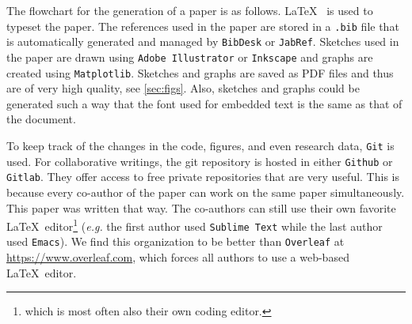 \documentclass[authoryear,3p,times,preprint,review,fleqn]{elsarticle}
\newcommand{\eg}{\textit{e.g.}\xspace}
\numberwithin{equation}{section}
\theoremstyle{remark}
\newtheorem{rmk}{Remark}
\begin{document}
The flowchart for the generation of a paper is as follows. \LaTeX~ is used to typeset the paper. The references used in the paper are stored in a \texttt{.bib} file that is automatically generated and managed by \texttt{BibDesk} or \texttt{JabRef}. Sketches used in the paper are drawn using \texttt{Adobe Illustrator} or \texttt{Inkscape} and graphs are created using \texttt{Matplotlib}. Sketches and graphs are saved as PDF files and thus are of very high quality, see \cref{sec:figs}. Also, sketches and graphs could be generated such a way that the font used for embedded text is the same as that of the  document.


To keep track of the changes in the code, figures, and even research data, \texttt{Git} is used. For collaborative writings, the git repository is hosted in either \texttt{Github} or \texttt{Gitlab}. They offer access to free private repositories that are very useful. This is because every co-author of the paper can work on the same paper simultaneously. This paper was written that way. 
The co-authors can still use their own favorite \LaTeX\ editor\footnote{which is most often also their own coding editor.} (\eg the first author used \texttt{Sublime Text} while the last author used \texttt{Emacs}). We find this organization to be better than \texttt{Overleaf} at \url{https://www.overleaf.com}, which forces all authors to use a web-based \LaTeX\ editor.




\end{document}
